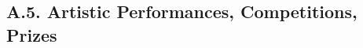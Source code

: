 \documentclass[12pt]{article}
\begin{document}



\subsection*{A.5. Artistic Performances, Competitions, Prizes}

\end{document}
